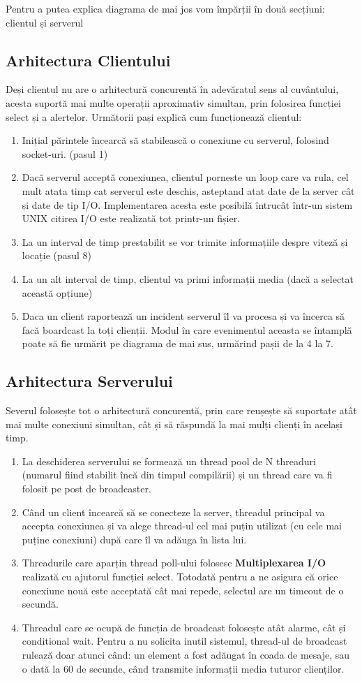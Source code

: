\documentclass{article}
\begin{document}
Pentru a putea explica diagrama de mai jos vom împărții în două secțiuni: clientul și serverul
\subsection{Arhitectura Clientului}
Deși clientul nu are o arhitectură concurentă în adevăratul sens al cuvântului, acesta suportă mai multe operații aproximativ simultan, prin folosirea funcției select și a alertelor. Următorii pași explică cum funcționează clientul:
\begin{enumerate}
    \item Inițial părintele încearcă să stabilească o conexiune cu serverul, folosind socket-uri. (pasul 1)
    \item Dacă serverul acceptă conexiunea, clientul porneste un loop care va rula, cel mult atata timp cat serverul este deschis, asteptand atat date de la server cât și date de tip I/O. Implementarea acesta este posibilă întrucât într-un sistem UNIX citirea I/O este realizată tot printr-un fișier. 
    \item La un interval de timp prestabilit se vor trimite informațiile despre viteză și locație (pasul 8)
    \item La un alt interval de timp, clientul va primi informații media (dacă a selectat această opțiune)
    \item Daca un client raportează un incident serverul îl va procesa și va încerca să facă boardcast la toți clienții. Modul în care evenimentul aceasta se întamplă poate să fie urmărit pe diagrama de mai sus, urmărind pașii de la 4 la 7.
\end{enumerate}
\subsection{Arhitectura Serverului}
Severul folosește tot o arhitectură concurentă, prin care reușește să suportate atât mai multe conexiuni simultan, cât și să răspundă la mai mulți clienți în același timp.
\begin{enumerate}
    \item La deschiderea serverului se formează un thread pool de N threaduri (numarul fiind stabilit încă din timpul compilării) și un thread care va fi folosit pe post de broadcaster.
    \item Când un client încearcă să se conecteze la server, threadul principal va accepta conexiunea și va alege thread-ul cel mai puțin utilizat (cu cele mai puține conexiuni) după care îl va adăuga în lista lui.
    \item Threadurile care aparțin thread poll-ului folosesc \textbf{Multiplexarea I/O} realizată cu ajutorul funcției select. Totodată pentru a ne asigura că orice conexiune nouă este acceptată cât mai repede, selectul are un timeout de o secundă. 
    \item Threadul care se ocupă de funcția de broadcast folosește atât alarme, cât și conditional wait. Pentru a nu solicita inutil sistemul, thread-ul de broadcast rulează doar atunci când: un element a fost adăugat în coada de mesaje, sau o dată la 60 de secunde, când transmite informații media tuturor clienților.
\end{enumerate}
\end{document}
